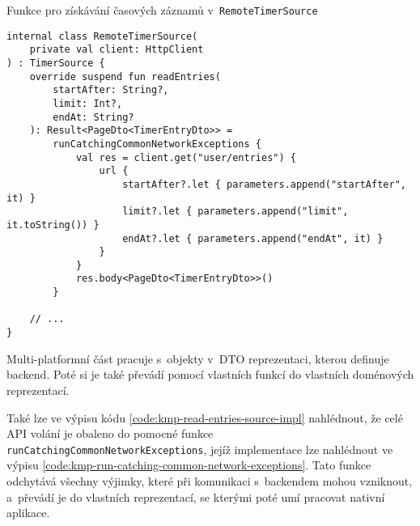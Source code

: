 \begin{listing}
\caption{Funkce pro získávání časových záznamů v~\texttt{RemoteTimerSource}}\label{code:kmp-read-entries-source-impl}
\begin{verbatim}
internal class RemoteTimerSource(
    private val client: HttpClient
) : TimerSource {
    override suspend fun readEntries(
        startAfter: String?,
        limit: Int?,
        endAt: String?
    ): Result<PageDto<TimerEntryDto>> =
        runCatchingCommonNetworkExceptions {
            val res = client.get("user/entries") {
                url {
                    startAfter?.let { parameters.append("startAfter", it) }
                    limit?.let { parameters.append("limit", it.toString()) }
                    endAt?.let { parameters.append("endAt", it) }
                }
            }
            res.body<PageDto<TimerEntryDto>>()
        }
        
    // ...
}
\end{verbatim}
\end{listing}

Multi-platformní část pracuje s~objekty v~DTO reprezentaci, kterou definuje backend. Poté si je také převádí pomocí vlastních funkcí do vlastních doménových reprezentací.

Také lze ve výpisu kódu \ref{code:kmp-read-entries-source-impl} nahlédnout, že celé API volání je obaleno do pomocné funkce \texttt{runCatchingCommonNetworkExceptions}, jejíž implementace lze nahlédnout ve výpisu \ref{code:kmp-run-catching-common-network-exceptions}. Tato funkce odchytává všechny výjimky, které při komunikaci s~backendem mohou vzniknout, a~převádí je do vlastních reprezentací, se kterými poté umí pracovat nativní aplikace.

